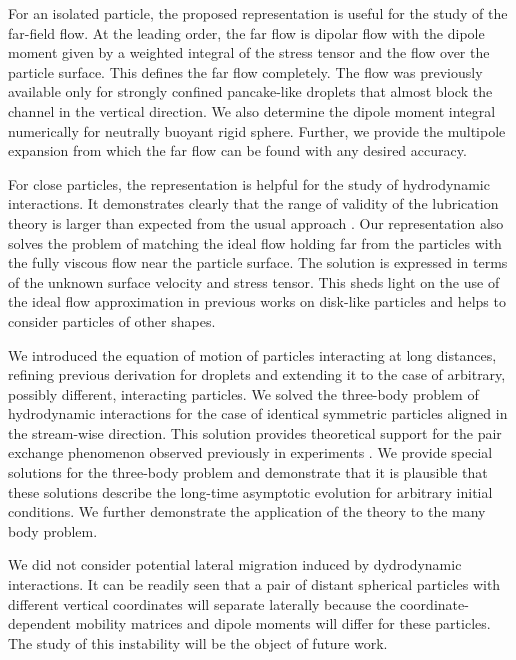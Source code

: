 For an isolated particle, the proposed representation is useful for the study of the far-field flow. At the leading order, the far flow is dipolar flow with the dipole moment given by 
a weighted integral of the stress tensor and the flow over the particle
surface. This defines the far flow completely. The flow was previously available only for strongly confined pancake-like droplets that almost block the channel in the vertical direction.  We also determine the dipole moment integral
numerically for neutrally buoyant rigid sphere. Further, we provide the multipole expansion from which the far flow can be found with any desired accuracy.

For close particles, the representation is helpful for the study of hydrodynamic interactions. 
It demonstrates clearly that the range of validity of the lubrication theory is larger than expected from the usual
approach \cite{Batchelor,lubr,szeri,bruce}. Our representation  also solves the problem of matching the ideal flow holding far from the particles with the fully viscous flow near the particle surface. The solution is expressed in terms of
the unknown surface velocity and stress tensor. This sheds light on the use of the ideal flow approximation in previous works on disk-like particles \cite{tl2014,is} and helps to consider particles of other shapes.

We introduced the equation of motion of particles interacting at long distances, refining previous derivation for droplets \cite{tl2014} and extending it to the case of arbitrary, 
possibly different, interacting particles. We solved the three-body problem of hydrodynamic interactions for the case of identical symmetric particles aligned in the stream-wise 
direction. This solution provides theoretical support for the pair exchange phenomenon observed previously in experiments \cite{tab0}. We provide special solutions for the three-body problem and demonstrate that it is plausible that these solutions describe the long-time asymptotic evolution for arbitrary initial conditions. We further demonstrate the application of the theory to the many body problem.

We did not consider potential lateral migration induced by dydrodynamic interactions. It can be readily seen that a pair of distant spherical particles with different vertical coordinates will separate laterally because the coordinate-dependent mobility matrices and dipole moments will differ for these particles. The study of this instability will be the object of future work.

